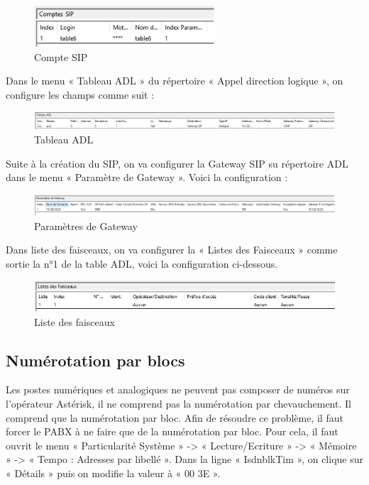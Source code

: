 \documentclass[12pt, a4paper]{article}
\begin{document}
	\begin{figure}[H]
		\centering
		\includegraphics[width=0.6\textwidth]{img/sip.png}
		\caption{Compte SIP}
		\label{fig:sip}
	\end{figure}

	Dans le menu « Tableau ADL » du répertoire « Appel direction logique »,
	on configure les champs comme suit : 

	\begin{figure}[H]
		\centering
		\includegraphics[width=1\textwidth]{img/adl.png}
		\caption{Tableau ADL}
		\label{fig:adl}
	\end{figure}

	Suite à la création du SIP, on va configurer la Gateway SIP su répertoire ADL
	dans le menu « Paramètre de Gateway ». Voici la configuration :

	\begin{figure}[H]
		\centering
		\includegraphics[width=1\textwidth]{img/paragate.png}
		\caption{Paramètres de Gateway}
		\label{fig:paragate}
	\end{figure}

	Dans liste des faisceaux, on va configurer la « Listes des Faisceaux » comme
	sortie la n°1 de la table ADL, voici la configuration ci-dessous.

	\begin{figure}[H]
		\centering
		\includegraphics[width=1\textwidth]{img/listefs.png}
		\caption{Liste des faisceaux}
		\label{fig:listefs}
	\end{figure}
	\newpage
	\subsection{Numérotation par blocs}

	Les postes numériques et analogiques ne peuvent pas composer de numéros sur
	l’opérateur Astérisk, il ne comprend pas la numérotation par chevauchement. Il comprend
	que la numérotation par bloc. Afin de résoudre ce problème, il faut forcer le PABX à ne
	faire que de la numérotation par bloc. Pour cela, il faut ouvrit le menu « Particularité
	Système » -> « Lecture/Ecriture » -> « Mémoire » -> « Tempo : Adresses par libellé ».
	Dans la ligne « IsdnblkTim », on clique sur « Détails » puis on modifie la valeur à
	« 00 3E ». 
\end{document}
